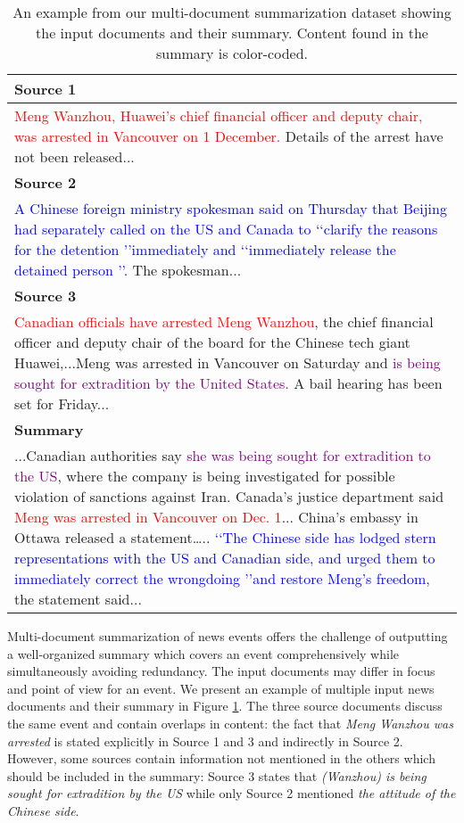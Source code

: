 \documentclass[11pt,a4paper]{article}
\begin{document}
\begin{table}[t!]
\centering
\small
\begin{tabularx}{\columnwidth}{|X|}
\hline
\textbf{Source 1} \\ \hline
\textcolor{red}{Meng Wanzhou, Huawei's chief financial officer and deputy chair, was arrested in Vancouver on 1 December.} Details of the arrest have not been released...\\

\hline

\textbf{Source 2} \\ \hline
\textcolor{blue}{A Chinese foreign ministry spokesman said on Thursday that Beijing had separately called on the US and Canada to \lq\lq clarify the reasons for the detention \rq\rq  immediately and \lq\lq immediately release the detained person \rq\rq.} The spokesman...\\

\hline
\textbf{Source 3}\\ \hline
\textcolor{red}{Canadian officials have arrested Meng Wanzhou}, the chief financial officer and deputy chair of the board for the Chinese tech giant Huawei,...Meng was arrested in Vancouver on Saturday and \textcolor{purple}{is being sought for extradition by the United States.} A bail hearing has been set for Friday...\\
\hline
\hline
\textbf{Summary} \\ \hline
...Canadian authorities say \textcolor{purple}{she was being sought for extradition to the US}, where the company is being investigated for possible violation of sanctions against Iran. Canada's justice department said \textcolor{red}{Meng was arrested in Vancouver on Dec. 1}... China's embassy in Ottawa released a statement….. \textcolor{blue}{\lq\lq The Chinese side has lodged stern representations with the US and Canadian side, and urged them to immediately correct the wrongdoing \rq\rq and restore Meng's freedom}, the statement said...\\
\hline
\end{tabularx}
\caption{An example from our multi-document summarization dataset showing the input documents and their summary. Content found in the summary is color-coded.}
\label{tab:example}
\end{table}



 Multi-document summarization of news events offers the challenge of outputting a well-organized summary which covers an event comprehensively while simultaneously avoiding redundancy.  The input documents may differ in focus and point of view for an event. We present an example of multiple input news documents and their summary in  Figure \ref{tab:example}. The three source documents discuss the same event and contain overlaps in content: the fact that \textit{Meng Wanzhou was arrested} is stated explicitly in Source 1 and 3 and indirectly in Source 2. However, some sources contain information not mentioned in the others which should be included in the summary: Source 3 states that \textit{(Wanzhou) is being sought for extradition by the US} while only Source 2 mentioned \textit{the attitude of the Chinese side}.
\end{document}
